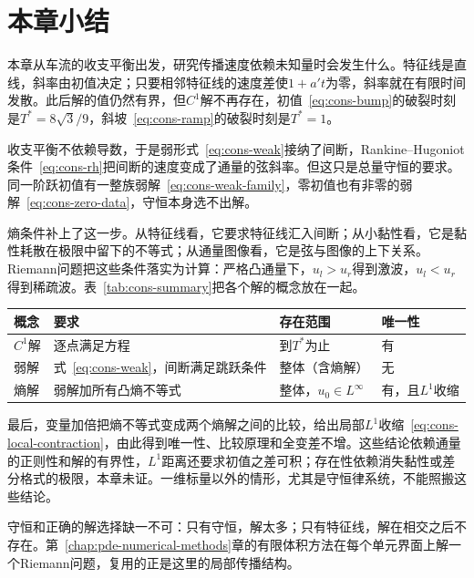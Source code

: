 \section{本章小结}
\label{sec:cons-summary}

本章从车流的收支平衡出发，研究传播速度依赖未知量时会发生什么。特征线是直线，斜率由初值决定；只要相邻特征线的速度差使$1+a't$为零，斜率就在有限时间发散。此后解的值仍然有界，但$C^1$解不再存在，初值~\eqref{eq:cons-bump}的破裂时刻是$T^{*}=8\sqrt{3}/9$，斜坡~\eqref{eq:cons-ramp}的破裂时刻是$T^{*}=1$。

收支平衡不依赖导数，于是弱形式~\eqref{eq:cons-weak}接纳了间断，Rankine--Hugoniot条件~\eqref{eq:cons-rh}把间断的速度变成了通量的弦斜率。但这只是总量守恒的要求。同一阶跃初值有一整族弱解~\eqref{eq:cons-weak-family}，零初值也有非零的弱解~\eqref{eq:cons-zero-data}，守恒本身选不出解。

熵条件补上了这一步。从特征线看，它要求特征线汇入间断；从小黏性看，它是黏性耗散在极限中留下的不等式；从通量图像看，它是弦与图像的上下关系。Riemann问题把这些条件落实为计算：严格凸通量下，$u_l>u_r$得到激波，$u_l<u_r$得到稀疏波。表~\ref{tab:cons-summary}把各个解的概念放在一起。

\begin{BookInlineTable}
  \centering
  \caption{标量守恒律的解的概念及其适用条件。}
  \label{tab:cons-summary}
  \begin{tabular}{p{16mm}p{32mm}p{24mm}p{20mm}}
    \toprule
    概念 & 要求 & 存在范围 & 唯一性\\
    \midrule
    $C^1$解 & 逐点满足方程 & 到$T^{*}$为止 & 有\\
    弱解 & 式~\eqref{eq:cons-weak}，间断满足跳跃条件 & 整体（含熵解） & 无\\
    熵解 & 弱解加所有凸熵不等式 & 整体，$u_0\in L^{\infty}$ & 有，且$L^1$收缩\\
    \bottomrule
  \end{tabular}
\end{BookInlineTable}

最后，变量加倍把熵不等式变成两个熵解之间的比较，给出局部$L^1$收缩~\eqref{eq:cons-local-contraction}，由此得到唯一性、比较原理和全变差不增。这些结论依赖通量的正则性和解的有界性，$L^1$距离还要求初值之差可积；存在性依赖消失黏性或差分格式的极限，本章未证。一维标量以外的情形，尤其是守恒律系统，不能照搬这些结论。

守恒和正确的解选择缺一不可：只有守恒，解太多；只有特征线，解在相交之后不存在。第~\ref{chap:pde-numerical-methods}章的有限体积方法在每个单元界面上解一个Riemann问题，复用的正是这里的局部传播结构。
